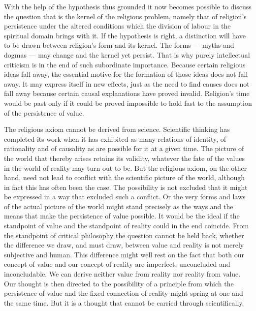 \documentclass[12pt,a4paper]{article}
\newcommand{\opage}[1]{\marginnote{\footnotesize\textit{[#1]}}}
\begin{document}
With the help of the hypothesis thus grounded it now becomes possible to
discuss the question that is the kernel of the religious problem, namely that
of religion's persistence under the altered conditions which the division of
labour in the spiritual domain brings with it. If the hypothesis is right, a
distinction will have to be drawn between religion's form and its kernel. The
forms --- myths and dogmas --- may change and the kernel yet persist. That is
why purely intellectual criticism is in the end of such subordinate importance.
Because certain religious ideas fall away, the essential motive for the
formation of those ideas does not fall away. It may express itself in new
effects, just as the need to find causes does not fall away because certain
causal explanations have proved invalid. Religion's time would be past only if
it could be proved impossible to hold fast to the assumption of the persistence
of value.

The religious axiom cannot be derived from science. Scientific thinking has
completed its work when it has exhibited as many relations of identity, of
rationality and of causality as are possible for it at a given time. The picture
of the world that thereby arises retains its validity, whatever the fate of the
values in the world of reality may turn out to be. But the religious axiom, on
the other hand, need not lead to conflict with the scientific picture of the
world, although in fact this has often been the case. The possibility is not
excluded that it might be expressed in a way that excluded such a conflict. Or
the very forms and laws of the actual picture of the world might stand
precisely as the ways and the means that make the persistence of value
possible. It would be the ideal if the standpoint of value and the standpoint
of reality could in the end coincide. From the standpoint of critical
philosophy the question cannot be held back, whether the difference we draw,
and must draw, between value and reality is not merely subjective and human.
This
\opage{419}difference might well rest on the fact that both our concept of value and our
concept of reality are imperfect, unconcluded and inconcludable. We can derive
neither value from reality nor reality from value. Our thought is then directed
to the possibility of a principle from which the persistence of value and the
fixed connection of reality might spring at one and the same time. But it is a
thought that cannot be carried through scientifically.
\end{document}
